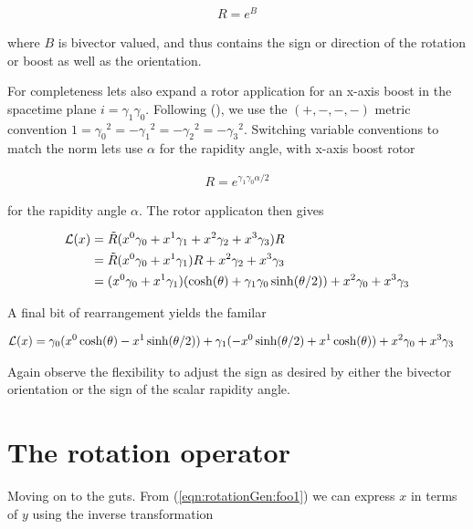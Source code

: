\begin{align}\label{eqn:rotationGen:foo33}
R = e^{B}
\end{align}

where $B$ is bivector valued, and thus contains the sign or direction of the rotation or boost as well as the orientation.


For completeness lets also expand a rotor application for an x-axis boost in the spacetime plane $i = \gamma_1 \gamma_0$.  Following (\cite{doran2003gap}), we use the $(+,-,-,-)$ metric convention $1 = {\gamma_0}^2 = -{\gamma_1}^2 = -{\gamma_2}^2 = -{\gamma_3}^2$.  Switching variable conventions to match the norm lets use $\alpha$ for the rapidity angle, with x-axis boost rotor

\begin{align}\label{eqn:rotationGen:foo34}
R = e^{\gamma_1 \gamma_0 \alpha/2}
\end{align}

for the rapidity angle $\alpha$.  The rotor applicaton then gives

\begin{align*}
\mathcal{L}(x) 
&= \tilde{R} (x^0 \gamma_0 + x^1 \gamma_1 + x^2 \gamma_2 + x^3 \gamma_3 ) R \\
&=
\tilde{R} (x^0 \gamma_0 + x^1 \gamma_1) R + x^2 \gamma_2 + x^3 \gamma_3 \\
&=
(x^0 \gamma_0 + x^1 \gamma_1) (\cosh(\theta) + \gamma_1 \gamma_0 \sinh(\theta/2)) + x^2 \gamma_0 + x^3 \gamma_3 \\
\end{align*}

A final bit of rearrangement yields the familar 

\begin{align}\label{eqn:rotationGen:foo35}
\mathcal{L}(x)
&=
\gamma_0 (x^0 \cosh(\theta) - x^1 \sinh(\theta/2))
+ \gamma_1 ( -x^0 \sinh(\theta/2) + x^1 \cosh(\theta))
+ x^2 \gamma_0 + x^3 \gamma_3 
\end{align}

Again observe the flexibility to adjust the sign as desired by either the bivector orientation or the sign of the scalar rapidity angle.

\section{The rotation operator}

Moving on to the guts.  From (\ref{eqn:rotationGen:foo1}) we can express $x$ in terms of $y$ using the inverse transformation

